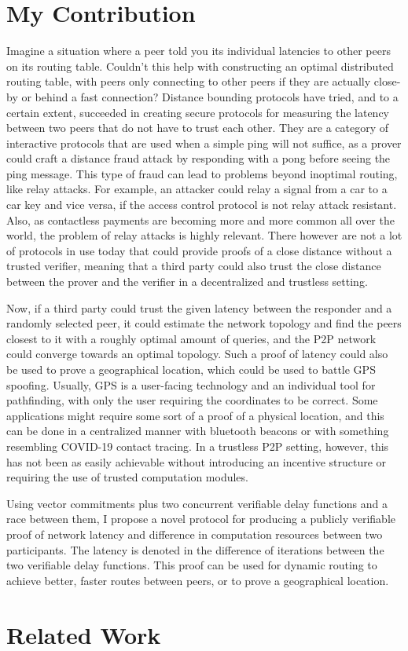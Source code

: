 \section{My Contribution}
Imagine a situation where a peer told you its individual latencies to other peers on its routing table. Couldn't this help with constructing an optimal distributed routing table, with peers only connecting to other peers if they are actually close-by or behind a fast connection? Distance bounding protocols have tried, and to a certain extent, succeeded in creating secure protocols for measuring the latency between two peers that do not have to trust each other. They are a category of interactive protocols that are used when a simple ping will not suffice, as a prover could craft a distance fraud attack by responding with a pong before seeing the ping message. This type of fraud can lead to problems beyond inoptimal routing, like relay attacks. For example, an attacker could relay a signal from a car to a car key and vice versa, if the access control protocol is not relay attack resistant. Also, as contactless payments are becoming more and more common all over the world, the problem of relay attacks is highly relevant. There however are not a lot of protocols in use today that could provide proofs of a close distance without a trusted verifier, meaning that a third party could also trust the close distance between the prover and the verifier in a decentralized and trustless setting.\cite{Maram_undated-it}

Now, if a third party could trust the given latency between the responder and a randomly selected peer, it could estimate the network topology and find the peers closest to it with a roughly optimal amount of queries, and the P2P network could converge towards an optimal topology. Such a proof of latency could also be used to prove a geographical location, which could be used to battle GPS spoofing. Usually, GPS is a user-facing technology and an individual tool for pathfinding, with only the user requiring the coordinates to be correct. Some applications might require some sort of a proof of a physical location, and this can be done in a centralized manner with bluetooth beacons or with something resembling COVID-19 contact tracing. In a trustless P2P setting, however, this has not been as easily achievable without introducing an incentive structure or requiring the use of trusted computation modules.

Using vector commitments plus two concurrent verifiable delay functions and a race between them, I propose a novel protocol for producing a publicly verifiable proof of network latency and difference in computation resources between two participants. The latency is denoted in the difference of iterations between the two verifiable delay functions. This proof can be used for dynamic routing to achieve better, faster routes between peers, or to prove a geographical location.

\section{Related Work}

